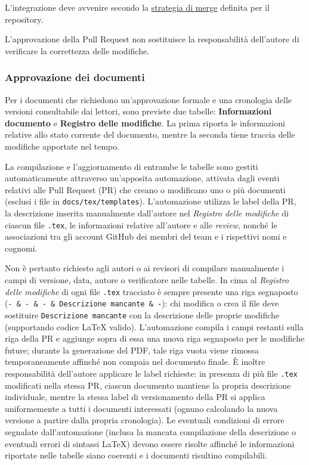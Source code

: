 \documentclass[11pt, a4paper]{article}
\begin{document}
\noindent L'integrazione deve avvenire secondo la \hyperref[subsec:pull-request-e-merge]{strategia di merge} definita per il repository.

L'approvazione della Pull Request non sostituisce la responsabilità dell'autore di verificare la correttezza delle modifiche.

\subsubsection{Approvazione dei documenti}

Per i documenti che richiedono un'approvazione formale e una cronologia delle versioni consultabile dai lettori, sono previste due tabelle: \textbf{Informazioni documento} e \textbf{Registro delle modifiche}. La prima riporta le informazioni relative allo stato corrente del documento, mentre la seconda tiene traccia delle modifiche apportate nel tempo.

La compilazione e l'aggiornamento di entrambe le tabelle sono gestiti automaticamente attraverso un'apposita automazione, attivata dagli eventi relativi alle Pull Request (PR) che creano o modificano uno o più documenti (esclusi i file in \texttt{docs/tex/templates}). L'automazione utilizza le label della PR, la descrizione inserita manualmente dall'autore nel \textit{Registro delle modifiche} di ciascun file \texttt{.tex}, le informazioni relative all'autore e alle \textit{review}, nonché le associazioni tra gli account GitHub dei membri del team e i rispettivi nomi e cognomi.

Non è pertanto richiesto agli autori o ai revisori di compilare manualmente i campi di versione, data, autore o verificatore nelle tabelle. In cima al \textit{Registro delle modifiche} di ogni file \texttt{.tex} tracciato è sempre presente una riga segnaposto (\texttt{- \& - \& - \& Descrizione mancante \& -}): chi modifica o crea il file deve sostituire \texttt{Descrizione mancante} con la descrizione delle proprie modifiche (supportando codice LaTeX valido). L'automazione compila i campi restanti sulla riga della PR e aggiunge sopra di essa una nuova riga segnaposto per le modifiche future; durante la generazione del PDF, tale riga vuota viene rimossa temporaneamente affinché non compaia nel documento finale. È inoltre responsabilità dell'autore applicare le label richieste: in presenza di più file \texttt{.tex} modificati nella stessa PR, ciascun documento mantiene la propria descrizione individuale, mentre la stessa label di versionamento della PR si applica uniformemente a tutti i documenti interessati (ognuno calcolando la nuova versione a partire dalla propria cronologia). Le eventuali condizioni di errore segnalate dall'automazione (inclusa la mancata compilazione della descrizione o eventuali errori di sintassi LaTeX) devono essere risolte affinché le informazioni riportate nelle tabelle siano coerenti e i documenti risultino compilabili.
\end{document}
